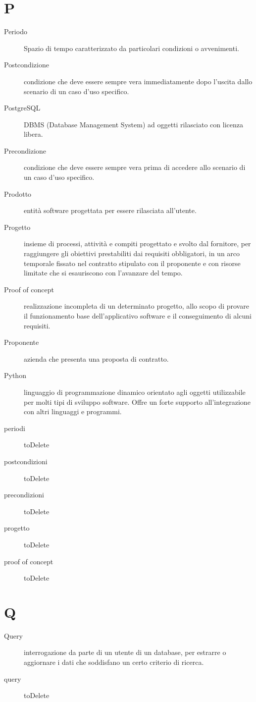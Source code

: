\documentclass{article}
\begin{document}
	\section{P}
	\begin{description}
		\item[Periodo] Spazio di tempo caratterizzato da particolari condizioni o avvenimenti.
		\item[Postcondizione] condizione che deve essere sempre vera immediatamente dopo l'uscita dallo scenario di un caso d'uso specifico.
		\item[PostgreSQL] DBMS (Database Management System) ad oggetti rilasciato con licenza libera.
		\item[Precondizione] condizione che deve essere sempre vera prima di accedere allo scenario di un caso d'uso specifico.
		\item[Prodotto] entità software progettata per essere rilasciata all'utente.
		\item[Progetto] insieme di processi, attività e compiti progettato e svolto dal fornitore, per raggiungere gli obiettivi prestabiliti dai requisiti obbligatori, in un arco temporale fissato nel contratto stipulato con il proponente e con risorse limitate che si esauriscono con l'avanzare del tempo.
		\item[Proof of concept] realizzazione incompleta di un determinato progetto, allo scopo di provare il funzionamento base dell'applicativo software e il conseguimento di alcuni requisiti.
		\item[Proponente] azienda che presenta una proposta di contratto.
		\item[Python] linguaggio di programmazione dinamico orientato agli oggetti utilizzabile per molti tipi di sviluppo software. Offre un forte supporto all'integrazione con altri linguaggi e programmi.
		\item[periodi] toDelete
		\item[postcondizioni] toDelete
		\item[precondizioni] toDelete
		\item[progetto] toDelete
		\item[proof of concept] toDelete
	\end{description}
	\section{Q}
	\begin{description}
		\item[Query] interrogazione da parte di un utente di un database, per estrarre o aggiornare i dati che soddisfano un certo criterio di ricerca.
		\item[query] toDelete
	\end{description}
\end{document}

